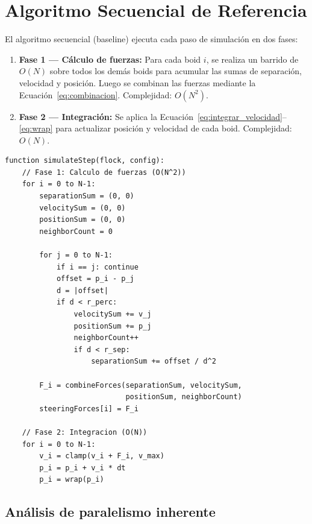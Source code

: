 \documentclass[11pt,a4paper]{article}
\begin{document}
\section{Algoritmo Secuencial de Referencia}
\label{sec:secuencial}

El algoritmo secuencial (baseline) ejecuta cada paso de simulación en dos fases:

\begin{enumerate}
  \item \textbf{Fase 1 — Cálculo de fuerzas:} Para cada boid $i$, se realiza un barrido de $O(N)$ sobre todos los demás boids para acumular las sumas de separación, velocidad y posición. Luego se combinan las fuerzas mediante la Ecuación~\ref{eq:combinacion}. Complejidad: $O(N^2)$.
  \item \textbf{Fase 2 — Integración:} Se aplica la Ecuación~\ref{eq:integrar_velocidad}--\ref{eq:wrap} para actualizar posición y velocidad de cada boid. Complejidad: $O(N)$.
\end{enumerate}

\begin{tcolorbox}[title=Pseudocódigo del algoritmo secuencial]
\begin{lstlisting}[language={},basicstyle=\ttfamily\small,numbers=none]
function simulateStep(flock, config):
    // Fase 1: Calculo de fuerzas (O(N^2))
    for i = 0 to N-1:
        separationSum = (0, 0)
        velocitySum = (0, 0)
        positionSum = (0, 0)
        neighborCount = 0
        
        for j = 0 to N-1:
            if i == j: continue
            offset = p_i - p_j
            d = |offset|
            if d < r_perc:
                velocitySum += v_j
                positionSum += p_j
                neighborCount++
                if d < r_sep:
                    separationSum += offset / d^2
        
        F_i = combineForces(separationSum, velocitySum,
                            positionSum, neighborCount)
        steeringForces[i] = F_i
    
    // Fase 2: Integracion (O(N))
    for i = 0 to N-1:
        v_i = clamp(v_i + F_i, v_max)
        p_i = p_i + v_i * dt
        p_i = wrap(p_i)
\end{lstlisting}
\end{tcolorbox}

\subsection{Análisis de paralelismo inherente}
\end{document}
